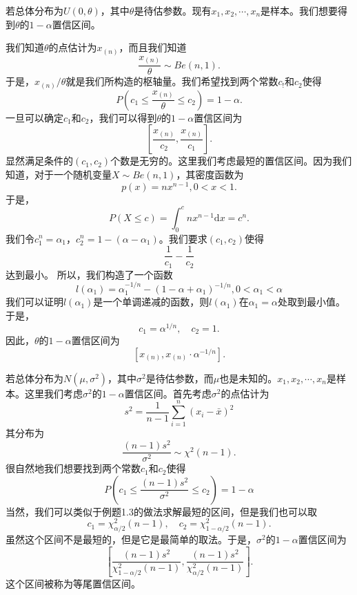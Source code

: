 \begin{example}
若总体分布为$U(0,\theta)$，其中$\theta$是待估参数。现有$x_1,x_2,\cdots,x_n$是样本。我们想要得到$\theta$的$1-\alpha$置信区间。
\end{example}
\begin{solution}
我们知道$\theta$的点估计为$x_{(n)}$，而且我们知道$$
\frac{x_{(n)}}{\theta} \sim Be(n,1).
$$
于是，$x_{(n)}/\theta$就是我们所构造的枢轴量。我们希望找到两个常数$c_!$和$c_2$使得
$$
P(c_1 \leq \frac{x_{(n)}}{\theta} \leq c_2) = 1-\alpha. 
$$
一旦可以确定$c_1$和$c_2$，我们可以得到$\theta$的$1-\alpha$置信区间为
$$
\left[\frac{x_{(n)}}{c_2}, \frac{x_{(n)}}{c_1}\right].
$$
显然满足条件的$(c_1,c_2)$个数是无穷的。这里我们考虑最短的置信区间。因为我们知道，对于一个随机变量$X\sim Be(n,1)$，其密度函数为
$$
p(x) = nx^{n-1}, 0<x<1.
$$
于是，
$$
P(X\leq c) = \int_{0}^c nx^{n-1}\text{d}x = c^{n}.
$$
我们令$c_1^n = \alpha_1$，$c_2^n = 1-(\alpha-\alpha_1)$。我们要求$(c_1,c_2)$使得
$$
\frac{1}{c_1} - \frac{1}{c_2}
$$
达到最小。
所以，我们构造了一个函数
$$
l(\alpha_1) = \alpha_1^{-1/n} - (1-\alpha+\alpha_1)^{-1/n}, 0<\alpha_1<\alpha
$$
我们可以证明$l(\alpha_1)$是一个单调递减的函数，则$l(\alpha_1)$在$\alpha_1 = \alpha$处取到最小值。于是，
$$
c_1 = \alpha^{1/n},\quad c_2 = 1.
$$
因此，$\theta$的$1-\alpha$置信区间为
$$
\left[ x_{(n)}, x_{(n)} \cdot \alpha^{-1/n} \right].
$$
\end{solution}


\begin{example}
若总体分布为$N(\mu,\sigma^2)$，其中$\sigma^2$是待估参数，而$\mu$也是未知的。$x_1,x_2,\cdots,x_n$是样本。这里我们考虑$\sigma^2$的$1-\alpha$置信区间。首先考虑$\sigma^2$的点估计为$$
s^2 = \frac{1}{n-1}\sum_{i=1}^{n} (x_i - \bar{x})^2
$$
其分布为
$$
\frac{(n-1)s^2}{\sigma^2} \sim \chi^2(n-1).
$$
很自然地我们想要找到两个常数$c_1$和$c_2$使得
$$
P(c_1\leq \frac{(n-1)s^2}{\sigma^2}\leq c_2 ) =1-\alpha
$$
当然，我们可以类似于例题1.3的做法求解最短的区间，但是我们也可以取
$$
c_1 = \chi_{\alpha/2}^{2}(n-1), \quad c_2 = \chi_{1-\alpha/2}^{2}(n-1).
$$
虽然这个区间不是最短的，但是它是最简单的取法。于是，$\sigma^2$的$1-\alpha$置信区间为
$$
\left[ \frac{(n-1)s^2}{\chi_{1-\alpha/2}^{2}(n-1)},  \frac{(n-1)s^2}{\chi_{\alpha/2}^{2}(n-1)}\right].
$$
这个区间被称为等尾置信区间。
\end{example}

